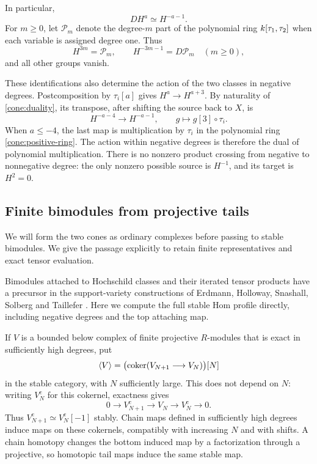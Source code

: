In particular,
\begin{equation}
 DH^a\simeq H^{-a-1}.
\label{cone:negative-duality}
\end{equation}
For $m\geq0$, let $\mathcal P_m$ denote the degree-$m$ part of the polynomial ring
$k[\tau_1,\tau_2]$ when each variable is assigned degree one.
Thus
\begin{equation}
 H^{3m}=\mathcal P_m,\qquad H^{-3m-1}=D\mathcal P_m\quad(m\geq0),
 \label{cone:support}
\end{equation}
and all other groups vanish.

These identifications also determine the action of the two classes in
negative degrees. Postcomposition by $\tau_i[a]$ gives
$H^a\to H^{a+3}$. By naturality of \eqref{cone:duality}, its transpose,
after shifting the source back to $X$, is
\[
 H^{-a-4}\longrightarrow H^{-a-1},\qquad
 g\longmapsto g[3]\circ\tau_i.
\]
When $a\leq-4$, the last map is multiplication by $\tau_i$ in the
polynomial ring \eqref{cone:positive-ring}. The action within negative
degrees is therefore the dual of polynomial multiplication.
There is no nonzero product crossing from negative to nonnegative degree:
the only nonzero possible source is $H^{-1}$, and its target is $H^2=0$.

\subsection{Finite bimodules from projective tails}

We will form the two cones as ordinary complexes before passing to stable
bimodules. We give the passage explicitly to retain finite representatives
and exact tensor evaluation.

Bimodules attached to Hochschild classes and their iterated tensor products
have a precursor in the support-variety constructions of Erdmann,
Holloway, Snashall, Solberg and Taillefer \cite[Section~2]{ErdmannEtAl2003}.
Here we compute the full stable Hom profile directly, including negative
degrees and the top attaching map.

If $V$ is a bounded below complex of finite projective $R$-modules that is
exact in sufficiently high degrees, put
\begin{equation}
 \langle V\rangle=
 \bigl(\operatorname{coker}(V_{N+1}\longrightarrow V_N)\bigr)[N]
 \label{cone:tail-definition}
\end{equation}
in the stable category, with $N$ sufficiently large.
This does not depend on $N$: writing $V_N^{\mathrm c}$ for this cokernel,
exactness gives
\[
 0\longrightarrow V_{N+1}^{\mathrm c}
 \longrightarrow V_N\longrightarrow V_N^{\mathrm c}
 \longrightarrow0.
\]
Thus $V_{N+1}^{\mathrm c}\simeq V_N^{\mathrm c}[-1]$ stably.
Chain maps defined in sufficiently high degrees induce maps on these
cokernels, compatibly with increasing $N$ and with shifts. A chain homotopy
changes the bottom induced map by a factorization through a projective,
so homotopic tail maps induce the same stable map.

